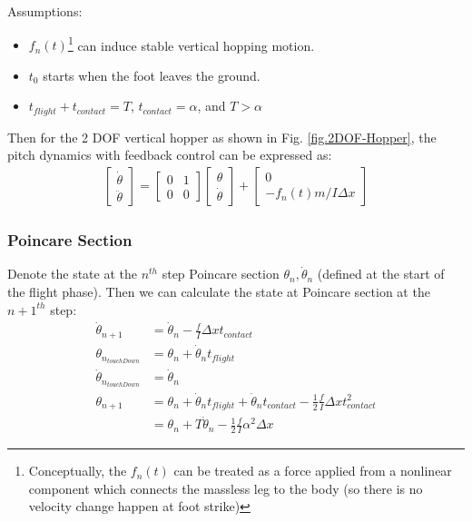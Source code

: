 Assumptions:
\begin{itemize}
\item $f_n(t)$\footnote{Conceptually, the $f_n(t)$ can be treated as a force applied from a nonlinear component which connects the massless leg to the body (so there is no velocity change happen at foot strike)} can induce stable vertical hopping motion.
\item $t_0$ starts when the foot leaves the ground.
\item $t_{flight} + t_{contact} = T$, $t_{contact} = \alpha$, and $T>\alpha$
\end{itemize}
Then for the 2 DOF vertical hopper as shown in Fig. \ref{fig.2DOF-Hopper}, the pitch dynamics with feedback control can be expressed as:
\begin{align}
\begin{bmatrix}
\dot \theta  \\
\ddot \theta
\end{bmatrix} = \begin{bmatrix}
0 & 1 \\
0 & 0
\end{bmatrix}\begin{bmatrix}
 \theta  \\
\dot \theta
\end{bmatrix} + 
\begin{bmatrix}
0  \\
-f_n(t)m/I\Delta x
\end{bmatrix}
\end{align}
\subsubsection{Poincare Section}
\noindent Denote the state at the $n^{th}$ step Poincare section $\theta_n, \dot \theta_n$ (defined at the start of the flight phase). Then we can calculate the state at Poincare section at the $n+1^{th}$ step:
\begin{align}
\label{eq:PoincareSection1}
\dot \theta_{n+1} &= \dot \theta_{n} - \frac{f}{I}\Delta x t_{contact} \\
\nonumber\theta_{n_{touchDown}} &= \theta_{n} + \dot \theta_{n}t_{flight}\\
\nonumber\dot \theta_{n_{touchDown}} &= \dot \theta_{n}\\
\nonumber\theta_{n+1} &= \theta_{n} + \dot \theta_{n}t_{flight} + \dot \theta_{n}t_{contact} - \frac{1}{2}\frac{f}{I}\Delta xt^2_{contact}\\
\label{eq:PoincareSection2} & = \theta_n + T\dot \theta_n - \frac{1}{2}\frac{f}{I}\alpha^2\Delta x
\end{align}


